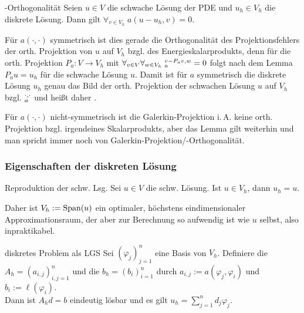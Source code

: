 \linie

\begin{Lemma}{-Orthogonalität}
    Seien $u \in V$ die schwache Lösung der PDE und
    $u_h \in V_h$ die diskrete Lösung.
    Dann gilt $\forall_{v \in V_h}\; a(u - u_h, v) = 0$.
\end{Lemma}

\begin{Bem}
    Für $a(\cdot, \cdot)$ symmetrisch ist dies gerade die Orthogonalität des
    Projektionsfehlers der orth. Projektion von $u$ auf $V_h$ bzgl. des Energieskalarprodukts,
    denn für die orth. Projektion $P_a\colon V \to V_h$ mit
    $\forall_{v \in V} \forall_{w \in V_h}\; \sp{v - P_a v, w}_a = 0$
    folgt nach dem Lemma $P_a u = u_h$ für die schwache Lösung $u$.
    Damit ist für $a$ symmetrisch die diskrete Lösung $u_h$ genau das Bild der
    orth. Projektion der schwachen Lösung $u$ auf $V_h$ bzgl. $\sp{\cdot, \cdot}_a$
    und heißt daher .

    Für $a(\cdot, \cdot)$ nicht-symmetrisch ist die Galerkin-Projektion i.\,A.
    keine orth. Projektion bzgl. irgendeines Skalarprodukts,
    aber das Lemma gilt weiterhin und man spricht immer noch von
    Galerkin-Projektion/-Orthogonalität.
\end{Bem}

\subsubsection{%
    Eigenschaften der diskreten Lösung%
}

\begin{Lemma}{Reproduktion der schw. Lsg.}
    Sei $u \in V$ die schw. Lösung.
    Ist $u \in V_h$, dann $u_h = u$.
\end{Lemma}

\begin{Bem}
    Daher ist $V_h := \operatorname{Span}(u)$ ein optimaler, höchstens eindimensionaler Approximationsraum,
    der aber zur Berechnung so aufwendig ist wie $u$ selbst, also inpraktikabel.
\end{Bem}

\linie

\begin{Satz}{diskretes Problem als LGS}
    Sei $(\varphi_j)_{j=1}^n$ eine Basis von $V_h$.
    Definiere die  $A_h = (a_{i,j})_{i,j=1}^n$
    und die  $b_h = (b_i)_{i=1}^n$ durch
    $a_{i,j} := a(\varphi_j, \varphi_i)$ und $b_i := \ell(\varphi_i)$.\\
    Dann ist $A_h d = b$ eindeutig lösbar und es gilt $u_h = \sum_{j=1}^n d_j \varphi_j$.
\end{Satz}

